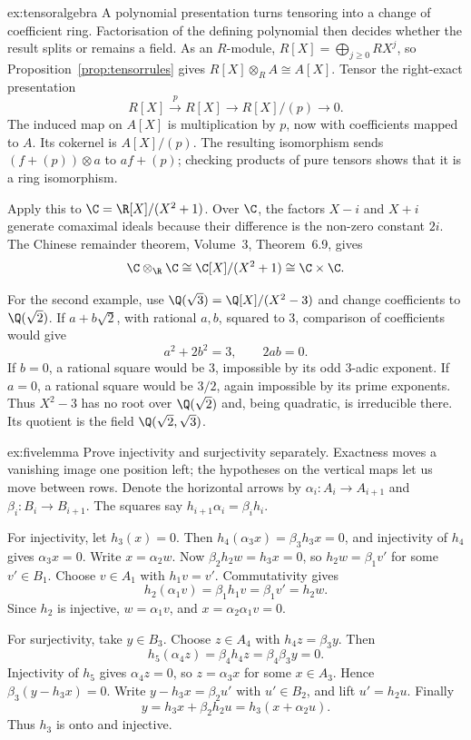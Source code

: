 \begin{solution}{ex:tensoralgebra}
\idea A polynomial presentation turns tensoring into a change of coefficient ring. Factorisation of the defining polynomial then decides whether the result splits or remains a field.
\writeup As an $R$-module, $R[X]=\bigoplus_{j\ge0}RX^j$, so Proposition~\ref{prop:tensorrules} gives $R[X]\otimes_RA\cong A[X]$. Tensor the right-exact presentation
\[
R[X]\xrightarrow{\,p\,}R[X]\to R[X]/(p)\to0.
\]
The induced map on $A[X]$ is multiplication by $p$, now with coefficients mapped to $A$. Its cokernel is $A[X]/(p)$. The resulting isomorphism sends $(f+(p))\otimes a$ to $af+(p)$; checking products of pure tensors shows that it is a ring isomorphism.

Apply this to $\C=\R[X]/(X^2+1)$. Over $\C$, the factors $X-i$ and $X+i$ generate comaximal ideals because their difference is the non-zero constant $2i$. The Chinese remainder theorem, Volume~3, Theorem~6.9, gives
\[
\C\otimes_\R\C\cong\C[X]/(X^2+1)\cong\C\times\C.
\]

For the second example, use $\Q(\sqrt3)=\Q[X]/(X^2-3)$ and change coefficients to $\Q(\sqrt2)$. If $a+b\sqrt2$, with rational $a,b$, squared to $3$, comparison of coefficients would give
\[
a^2+2b^2=3,\qquad 2ab=0.
\]
If $b=0$, a rational square would be $3$, impossible by its odd $3$-adic exponent. If $a=0$, a rational square would be $3/2$, again impossible by its prime exponents. Thus $X^2-3$ has no root over $\Q(\sqrt2)$ and, being quadratic, is irreducible there. Its quotient is the field $\Q(\sqrt2,\sqrt3)$.
\end{solution}

\begin{solution}{ex:fivelemma}
\idea Prove injectivity and surjectivity separately. Exactness moves a vanishing image one position left; the hypotheses on the vertical maps let us move between rows.
\writeup Denote the horizontal arrows by $\alpha_i\colon A_i\to A_{i+1}$ and $\beta_i\colon B_i\to B_{i+1}$. The squares say $h_{i+1}\alpha_i=\beta_i h_i$.

For injectivity, let $h_3(x)=0$. Then $h_4(\alpha_3x)=\beta_3h_3x=0$, and injectivity of $h_4$ gives $\alpha_3x=0$. Write $x=\alpha_2w$. Now $\beta_2h_2w=h_3x=0$, so $h_2w=\beta_1v'$ for some $v'\in B_1$. Choose $v\in A_1$ with $h_1v=v'$. Commutativity gives
\[
h_2(\alpha_1v)=\beta_1h_1v=\beta_1v'=h_2w.
\]
Since $h_2$ is injective, $w=\alpha_1v$, and $x=\alpha_2\alpha_1v=0$.

For surjectivity, take $y\in B_3$. Choose $z\in A_4$ with $h_4z=\beta_3y$. Then
\[
h_5(\alpha_4z)=\beta_4h_4z=\beta_4\beta_3y=0.
\]
Injectivity of $h_5$ gives $\alpha_4z=0$, so $z=\alpha_3x$ for some $x\in A_3$. Hence $\beta_3(y-h_3x)=0$. Write $y-h_3x=\beta_2u'$ with $u'\in B_2$, and lift $u'=h_2u$. Finally
\[
y=h_3x+\beta_2h_2u=h_3(x+\alpha_2u).
\]
Thus $h_3$ is onto and injective.
\end{solution}

